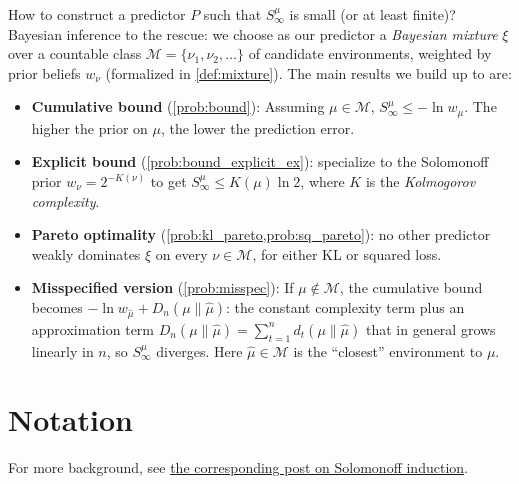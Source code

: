 \documentclass[fontsize=11pt, parskip=half]{scrartcl}
\theoremstyle{definition}
\newcommand{\Mc}{\mathcal{M}}
\begin{document}
How to construct a predictor $P$ such that $S^\mu_\infty$ is small (or at least finite)? Bayesian inference to the rescue: we choose as our predictor a \emph{Bayesian mixture} $\xi$ over a countable class $\Mc = \{\nu_1, \nu_2, \dots\}$ of candidate environments, weighted by prior beliefs $w_\nu$ (formalized in \cref{def:mixture}). The main results we build up to are:
\begin{itemize}\itemsep=2pt
  \item \textbf{Cumulative bound} (\cref{prob:bound}): Assuming $\mu \in \Mc$, $S^\mu_\infty \leq -\ln w_\mu$. The higher the prior
  on $\mu$, the lower the prediction error.
  \item \textbf{Explicit bound} (\cref{prob:bound_explicit_ex}): specialize to the Solomonoff prior $w_\nu = 2^{-K(\nu)}$ to get $S^\mu_\infty \leq K(\mu)\ln 2$, where $K$ is the \emph{Kolmogorov complexity}.
  \item \textbf{Pareto optimality} (\cref{prob:kl_pareto,prob:sq_pareto}): no other predictor weakly dominates $\xi$ on every $\nu \in \Mc$, for either KL or squared loss.
  \item \textbf{Misspecified version} (\cref{prob:misspec}): If $\mu \not\in \Mc$, the cumulative bound becomes $-\ln w_{\hat\mu} + D_n(\mu \parallel \hat\mu)$: the constant complexity term plus an approximation term $D_n(\mu \parallel \hat\mu) = \sum_{t=1}^n d_t(\mu \parallel \hat\mu)$ that in general grows linearly in $n$, so $S^\mu_\infty$ diverges. Here $\hat{\mu} \in \Mc$ is the ``closest'' environment to $\mu$.
\end{itemize}

\section*{Notation}

For more background, see \href{https://www.lesswrong.com/posts/HSDumToH57nSRdLST/a-technical-introduction-to-solomonoff-induction-without-k}{the corresponding post on Solomonoff induction}.
\end{document}
